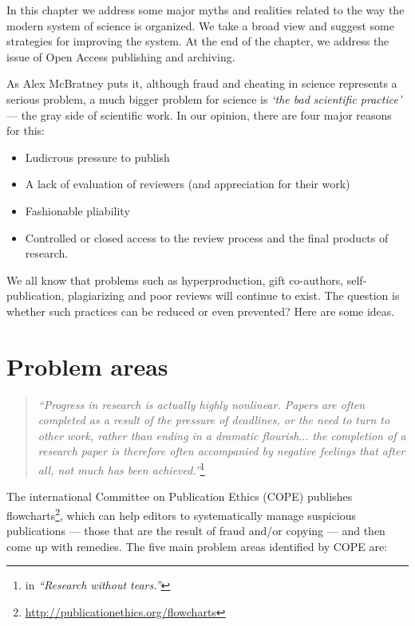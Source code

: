 \documentclass[graybox,envcountchap,sectrefs,UStrade]{svmono}
\begin{document}
In this chapter we address some major myths and realities related to the way the modern system of science is organized. We take a broad view and suggest some strategies for improving the system. At the end of the chapter, we address the issue of Open Access publishing and archiving. \par

As Alex McBratney puts it, although fraud and cheating in science represents a serious problem, a much bigger problem for science is \emph{`the bad scientific practice'} --- the gray side of scientific work. In our opinion, there are four major reasons for this:

\begin{itemize}
 \item Ludicrous pressure to publish
 \item A lack of evaluation of reviewers (and appreciation for their work)
 \item Fashionable pliability
 \item Controlled or closed access to the review process and the final products of research.
\end{itemize}

We all know that problems such as hyperproduction, gift co-authors, self-publication, plagiarizing and poor reviews will continue to exist. The question is whether such practices can be reduced or even prevented? Here are some ideas. \par


\section{Problem areas}

\begin{quote}
    \emph{``Progress in research is actually highly nonlinear. Papers are often completed as a result of the pressure of deadlines, or the need to turn to other work, rather than ending in a dramatic flourish$\ldots$ the completion of a research paper is therefore often accompanied by negative feelings that after all, not much has been achieved.''}\footnote{\citet{Creedy2008research} in \emph{``Research without tears.''}}
\end{quote}

The international Committee on Publication Ethics (COPE) publishes flow\-charts\footnote{\url{http://publicationethics.org/flowcharts}}, which can help editors to systematically manage suspicious publications --- those that are the result of fraud and/or copying --- and then come up with remedies. The five main problem areas identified by COPE are:
\end{document}
